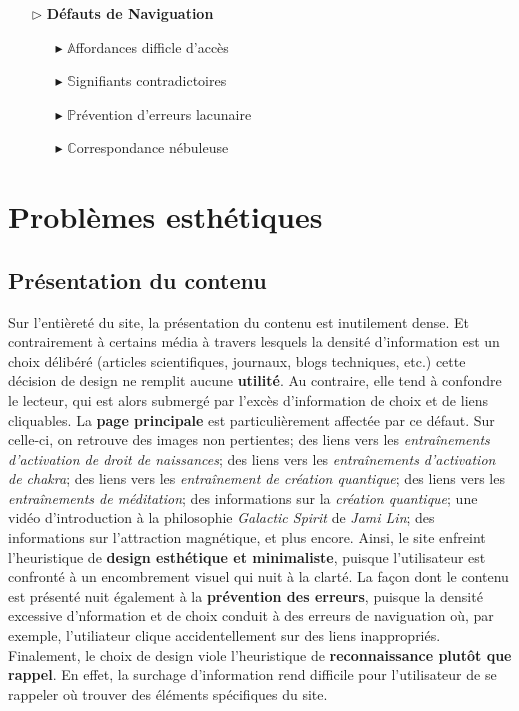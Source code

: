 \documentclass[9pt]{report}
\begin{document}
\begin{multicols*}{2}
    \begin{itemize}
    \item [$\rhd$ ] \textbf{Défauts de Naviguation}  
      \begin{itemize}
        \item [$\blacktriangleright$ ] $\mathbb{A}$ffordances difficle d'accès 
        \item [$\blacktriangleright$ ] $\mathbb{S}$ignifiants contradictoires
        \item [$\blacktriangleright$ ] $\mathbb{P}$révention d'erreurs lacunaire
        \item [$\blacktriangleright$ ] $\mathbb{C}$orrespondance nébuleuse
      \end{itemize}
  \end{itemize}

  \section{Problèmes esthétiques}
  \subsection{Présentation du contenu}
  Sur l'entièreté du site, la présentation du contenu est 
  inutilement dense. Et contrairement à certains média 
  à travers lesquels la densité d'information est un choix délibéré 
  (articles scientifiques, journaux, blogs techniques, etc.) cette décision 
  de design ne remplit aucune \textbf{utilité}. Au contraire, elle 
  tend à confondre le lecteur, qui est alors submergé par l'excès 
  d'information 
  de choix et de liens cliquables. La \textbf{page principale} est particulièrement 
  affectée par ce défaut. Sur celle-ci, on retrouve des images 
  non pertientes; des liens vers les 
  \textit{entraînements d'activation de droit de naissances};  
  des liens vers les \textit{entraînements d'activation de chakra};
  des liens vers les \textit{entraînement de création quantique}; 
  des liens vers les \textit{entraînements de méditation}; des informations 
  sur la \textit{création quantique}; une vidéo d'introduction 
  à la philosophie \textit{Galactic Spirit} de \textit{\textit{Jami Lin}}; 
  des informations sur l'attraction magnétique, et plus encore. 
  Ainsi, le site enfreint l'heuristique de 
  \textbf{design esthétique et minimaliste}, puisque l'utilisateur 
  est confronté à un encombrement visuel qui nuit à la clarté. 
  La façon dont le contenu est présenté nuit également 
  à la \textbf{prévention des erreurs}, puisque la densité 
  excessive d'nformation et de choix conduit à des erreurs de naviguation 
  où, par exemple, l'utiliateur clique accidentellement sur des 
  liens inappropriés. Finalement, le choix de design viole l'heuristique de 
  \textbf{reconnaissance plutôt que rappel}. En effet, la surchage 
  d'information rend difficile pour l'utilisateur de se rappeler 
  où trouver des éléments spécifiques du site. 



\end{multicols*}
\end{document}
